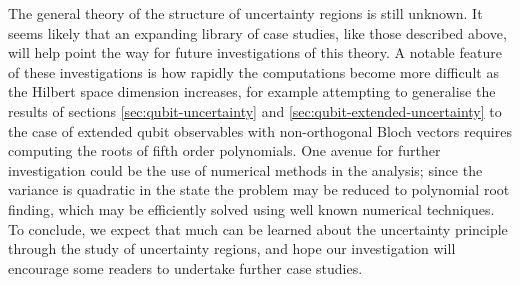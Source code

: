 The general theory of the structure of uncertainty regions is still unknown. It seems likely that an expanding library of case studies, like those described above, will help point the way for future investigations of this theory. A notable feature of these investigations is how rapidly the computations become more difficult as the Hilbert space dimension increases, for example attempting to generalise the results of sections \ref{sec:qubit-uncertainty} and \ref{sec:qubit-extended-uncertainty} to the case of extended qubit observables with non-orthogonal Bloch vectors requires computing the roots of fifth order polynomials. One avenue for further investigation could be the use of numerical methods in the analysis; since the variance is quadratic in the state the problem may be reduced to polynomial root finding, which may be efficiently solved using well known numerical techniques.
To conclude, we expect that much can be learned about the uncertainty principle through the study of uncertainty regions, and hope our investigation will encourage some readers to undertake further case studies.

